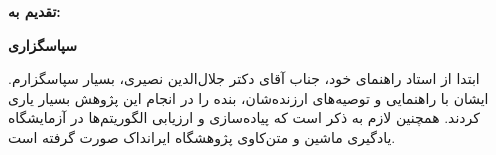 \thispagestyle{empty}

\noindent
\textbf{\Large تقدیم به:}
\vskip 1cm

\newpage
\thispagestyle{empty}

\begin{center}
\textbf{\Large سپاسگزاری}
\end{center}
\vskip 1cm
\noindent ابتدا از استاد راهنمای خود، جناب آقای دکتر جلال‌الدین نصیری، بسیار سپاسگزارم. ایشان با راهنمایی و توصیه‌های ارزنده‌شان، بنده را در انجام این پژوهش بسیار یاری کردند.  همچنین لازم به ذکر است که پیاده‌سازی و ارزیابی الگوریتم‌ها در آزمایشگاه یادگیری ماشین و متن‌کاوی  پژوهشگاه ایرانداک صورت گرفته است.

\vskip 1cm
